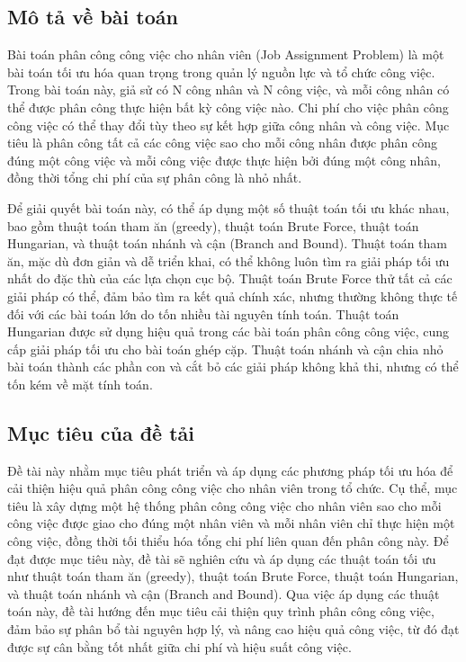 {}
\setcounter{section}{1}

\subsection{Mô tả về bài toán}
Bài toán phân công công việc cho nhân viên (Job Assignment Problem) là một bài toán tối ưu hóa quan trọng trong quản lý nguồn lực và tổ chức công việc. Trong bài toán này, giả sử có N công nhân và N công việc, và mỗi công nhân có thể được phân công thực hiện bất kỳ công việc nào. Chi phí cho việc phân công công việc có thể thay đổi tùy theo sự kết hợp giữa công nhân và công việc. Mục tiêu là phân công tất cả các công việc sao cho mỗi công nhân được phân công đúng một công việc và mỗi công việc được thực hiện bởi đúng một công nhân, đồng thời tổng chi phí của sự phân công là nhỏ nhất.

Để giải quyết bài toán này, có thể áp dụng một số thuật toán tối ưu khác nhau, bao gồm thuật toán tham ăn (greedy), thuật toán Brute Force, thuật toán Hungarian, và thuật toán nhánh và cận (Branch and Bound). Thuật toán tham ăn, mặc dù đơn giản và dễ triển khai, có thể không luôn tìm ra giải pháp tối ưu nhất do đặc thù của các lựa chọn cục bộ. Thuật toán Brute Force thử tất cả các giải pháp có thể, đảm bảo tìm ra kết quả chính xác, nhưng thường không thực tế đối với các bài toán lớn do tốn nhiều tài nguyên tính toán. Thuật toán Hungarian được sử dụng hiệu quả trong các bài toán phân công công việc, cung cấp giải pháp tối ưu cho bài toán ghép cặp. Thuật toán nhánh và cận chia nhỏ bài toán thành các phần con và cắt bỏ các giải pháp không khả thi, nhưng có thể tốn kém về mặt tính toán.

\subsection{Mục tiêu của đề tải}
Đề tài này nhằm mục tiêu phát triển và áp dụng các phương pháp tối ưu hóa để cải thiện hiệu quả phân công công việc cho nhân viên trong tổ chức. Cụ thể, mục tiêu là xây dựng một hệ thống phân công công việc cho nhân viên sao cho mỗi công việc được giao cho đúng một nhân viên và mỗi nhân viên chỉ thực hiện một công việc, đồng thời tối thiểu hóa tổng chi phí liên quan đến phân công này. Để đạt được mục tiêu này, đề tài sẽ nghiên cứu và áp dụng các thuật toán tối ưu như thuật toán tham ăn (greedy), thuật toán Brute Force, thuật toán Hungarian, và thuật toán nhánh và cận (Branch and Bound). Qua việc áp dụng các thuật toán này, đề tài hướng đến mục tiêu cải thiện quy trình phân công công việc, đảm bảo sự phân bổ tài nguyên hợp lý, và nâng cao hiệu quả công việc, từ đó đạt được sự cân bằng tốt nhất giữa chi phí và hiệu suất công việc.

